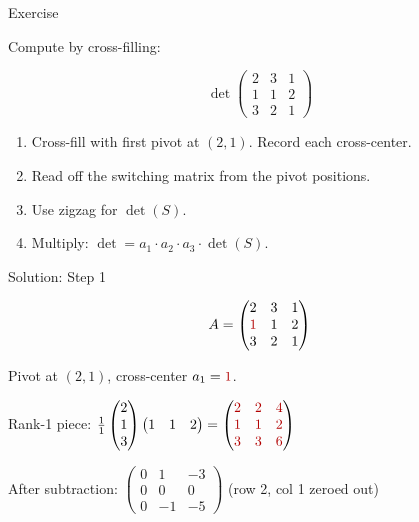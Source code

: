 \documentclass[10pt]{beamer}
\theoremstyle{definition}
\newcommand{\rd}[1]{{\color{red!70!black}#1}}
\begin{document}
\begin{frame}{Exercise}

Compute by cross-filling:

$$
\det\begin{pmatrix} 2 & 3 & 1 \\ 1 & 1 & 2 \\ 3 & 2 & 1 \end{pmatrix}
$$

\vfill

\begin{enumerate}
\item Cross-fill with first pivot at $(2,1)$. Record each cross-center.
\item Read off the switching matrix from the pivot positions.
\item Use zigzag for $\det(S)$.
\item Multiply: $\det = a_1 \cdot a_2 \cdot a_3 \cdot \det(S)$.
\end{enumerate}

\end{frame}


\begin{frame}{Solution: Step 1}

$$
A = \begin{pmatrix} 2 & 3 & 1 \\ \rd{1} & 1 & 2 \\ 3 & 2 & 1 \end{pmatrix}
$$

Pivot at $(2,1)$, cross-center $a_1 = \rd{1}$.

\vfill

Rank-1 piece: $\frac{1}{1}\begin{pmatrix}2\\1\\3\end{pmatrix}\begin{pmatrix}1&1&2\end{pmatrix} = \begin{pmatrix}\rd{2}&\rd{2}&\rd{4}\\\rd{1}&\rd{1}&\rd{2}\\\rd{3}&\rd{3}&\rd{6}\end{pmatrix}$

\vfill

After subtraction: $\begin{pmatrix}0&1&-3\\0&0&0\\0&-1&-5\end{pmatrix}$ \quad (row 2, col 1 zeroed out)

\end{frame}
\end{document}

